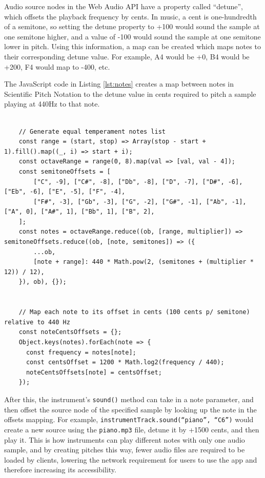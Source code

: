 Audio source nodes in the Web Audio API have a property called “detune”, which offsets the playback frequency by cents. In music, a cent is one-hundredth of a semitone, so setting the detune property to +100 would sound the sample at one semitone higher, and a value of -100 would sound the sample at one semitone lower in pitch. Using this information, a map can be created which maps notes to their corresponding detune value. For example, A4 would be +0, B4 would be +200, F4 would map to -400, etc.

The JavaScript code in Listing \ref{lst:notes} creates a map between notes in Scientific Pitch Notation to the detune value in cents required to pitch a sample playing at 440Hz to that note.

\begin{lstlisting}[float, caption={Creates a map "noteCentsOffsets" between notes in Scientific Pitch Notation to the detune value in cents required to pitch a sample playing at 440Hz to that note}, label=lst:notes]

    // Generate equal temperament notes list
    const range = (start, stop) => Array(stop - start + 1).fill().map((_, i) => start + i);
    const octaveRange = range(0, 8).map(val => [val, val - 4]);
    const semitoneOffsets = [
        ["C", -9], ["C#", -8], ["Db", -8], ["D", -7], ["D#", -6], ["Eb", -6], ["E", -5], ["F", -4],
        ["F#", -3], ["Gb", -3], ["G", -2], ["G#", -1], ["Ab", -1], ["A", 0], ["A#", 1], ["Bb", 1], ["B", 2],
    ];
    const notes = octaveRange.reduce((ob, [range, multiplier]) => semitoneOffsets.reduce((ob, [note, semitones]) => ({
        ...ob,
        [note + range]: 440 * Math.pow(2, (semitones + (multiplier * 12)) / 12),
    }), ob), {});
    
    
    // Map each note to its offset in cents (100 cents p/ semitone) relative to 440 Hz
    const noteCentsOffsets = {};
    Object.keys(notes).forEach(note => {
      const frequency = notes[note];
      const centsOffset = 1200 * Math.log2(frequency / 440);
      noteCentsOffsets[note] = centsOffset;
    });

\end{lstlisting}

After this, the instrument’s \verb|sound()| method can take in a note parameter, and then offset the source node of the specified sample by looking up the note in the offsets mapping. For example, \verb|instrumentTrack.sound(“piano”, “C6”)| would create a new source using the \verb|piano.mp3| file, detune it by +1500 cents, and then play it. This is how instruments can play different notes with only one audio sample, and by creating pitches this way, fewer audio files are required to be loaded by clients, lowering the network requirement for users to use the app and therefore increasing its accessibility.

